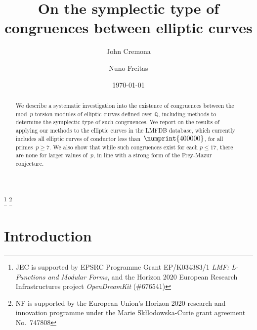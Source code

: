 \documentclass[12pt]{amsart}
\newcommand{\Q}{\mathbb{Q}}
\numberwithin{equation}{section}
\theoremstyle{definition}
\theoremstyle{remark}
\begin{document}
\title{On the symplectic type of congruences between elliptic curves} %

\author{John Cremona}
\address{Mathematics Institute,
         University of Warwick,
         Coventry CV4 7AL,
         United Kingdom}

\author{Nuno Freitas}
\address{Mathematics Institute,
         University of Warwick,
         Coventry CV4 7AL,
         United Kingdom}


\date{\today}


\thanks{JEC is supported by EPSRC Programme Grant EP/K034383/1
  \textit{LMF: L-Functions and Modular Forms}, and the Horizon 2020
  European Research Infrastructures project \textit{OpenDreamKit}
  (\#676541)}
\thanks{NF is supported by the European Union's
  Horizon 2020 research and innovation programme under the Marie
  Sk\l{l}odowska-Curie grant agreement No.\ 747808}


\begin{abstract}
We describe a systematic investigation into the existence of
congruences between the mod~$p$ torsion modules of elliptic curves
defined over $\Q$, including methods to determine the symplectic type
of such congruences.  We report on the results of applying our methods
to the elliptic curves in the LMFDB database, which currently includes
all elliptic curves of conductor less than~$\numprint{400000}$, for
all primes~$p\ge7$.  We also show that while such congruences exist
for each $p\le17$, there are none for larger values of~$p$, in line
with a strong form of the Frey-Mazur conjecture.
\end{abstract}

\maketitle


\section{Introduction}
\end{document}
